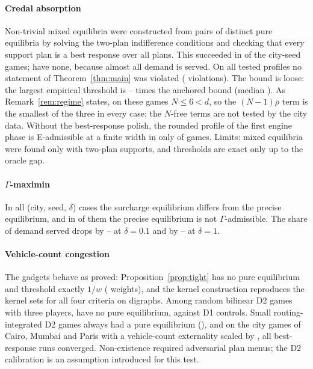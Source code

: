 \documentclass[preprint,12pt]{elsarticle}
\theoremstyle{definition}
\theoremstyle{remark}
\begin{document}
\paragraph{Credal absorption} Non-trivial mixed equilibria were constructed from pairs of distinct pure equilibria by solving the two-plan indifference conditions and checking that every support plan is a best response over all plans. This succeeded in \ThGamesMixed{} of the \ThGamesTotal{} city-seed games; \ThNoMixedCities{} have none, because almost all demand is served. On all \ThProfiles{} tested profiles no statement of Theorem~\ref{thm:main} was violated (\ThViol{} violations). The bound is loose: the largest empirical threshold is \ThRatioMin--\ThRatioMax{} times the anchored bound (median \ThRatioMed). As Remark~\ref{rem:regime} states, on these games $N\le6<d$, so the $(N-1)\bar\rho$ term is the smallest of the three in every case; the $N$-free terms are not tested by the city data. Without the best-response polish, the rounded profile of the first engine phase is E-admissible at a finite width in only \ThZmcFinite{} of \ThZmcN{} games. Limits: mixed equilibria were found only with two-plan supports, and thresholds are exact only up to the oracle gap.

\paragraph{$\Gamma$-maximin} In all \ThGamCases{} (city, seed, $\delta$) cases the surcharge equilibrium differs from the precise equilibrium, and in \ThGamNotAdm{} of them the precise equilibrium is not $\Gamma$-admissible. The share of demand served drops by \ThGamDropLoMin--\ThGamDropLoMax{} at $\delta=0.1$ and by \ThGamDropHiMin--\ThGamDropHiMax{} at $\delta=1$.

\paragraph{Vehicle-count congestion} The gadgets behave as proved: Proposition~\ref{prop:tight} has no pure equilibrium and threshold exactly $1/w$ (\ThPropOK{} weights), and the kernel construction reproduces the kernel sets for all four criteria on \ThKernOK{} digraphs. Among random bilinear D2 games with three players, \ThRandDtwo{} have no pure equilibrium, against \ThRandDone{} D1 controls. Small routing-integrated D2 games always had a pure equilibrium (\ThTiny{}), and on the city games of Cairo, Mumbai and Paris with a vehicle-count externality scaled by \ThCityScales{}, all \ThCityRuns{} best-response runs converged. Non-existence required adversarial plan menus; the D2 calibration is an assumption introduced for this test.
\end{document}
